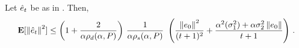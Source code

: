 \begin{theorem}\label{th:pdrate}
Let $\hat{e}_t$ be as in . %
Then,
\begin{align}
\mathbf{E}[\left\| \hat{e}_t\right\|^2]
\leq \left(1+\frac2{\alpha\rho_d(\alpha,P)}\right)\, \frac1{\alpha\rho_s(\alpha,P)}\, \,
\left(\frac{\left\| e_0\right\|^2}{(t+1)^2}+ \frac{\alpha^2(\sigma_1^2)+\alpha \sigma_2^2\left\| e_0\right\|}{t+1} \right)\,.
\end{align}
\end{theorem}
